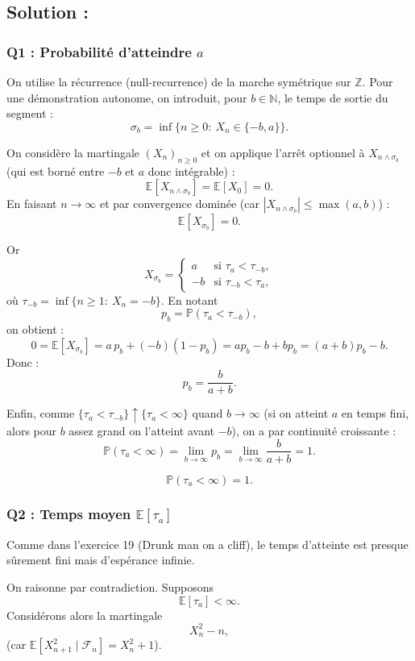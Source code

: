 \subsection*{Solution :}

\subsubsection*{Q1 : Probabilité d'atteindre $a$}

On utilise la récurrence (null-recurrence) de la marche symétrique sur $\mathbb{Z}$.
Pour une démonstration autonome, on introduit, pour $b\in\mathbb{N}$, le temps de sortie du segment :
\[
\sigma_b=\inf\{n\ge 0:\ X_n\in\{-b,a\}\}.
\]

On considère la martingale $(X_n)_{n\ge 0}$ et on applique l'arrêt optionnel à $X_{n\wedge\sigma_b}$ (qui est borné entre $-b$ et $a$ donc intégrable) :
\[
\mathbb{E}[X_{n\wedge\sigma_b}]=\mathbb{E}[X_0]=0.
\]
En faisant $n\to\infty$ et par convergence dominée (car $|X_{n\wedge\sigma_b}|\le \max(a,b)$) :
\[
\mathbb{E}[X_{\sigma_b}]=0.
\]

Or
\[
X_{\sigma_b}=
\begin{cases}
a & \text{si } \tau_a<\tau_{-b},\\
-b & \text{si } \tau_{-b}<\tau_a,
\end{cases}
\]
où $\tau_{-b}=\inf\{n\ge1:\ X_n=-b\}$.
En notant
\[
p_b=\mathbb{P}(\tau_a<\tau_{-b}),
\]
on obtient :
\[
0=\mathbb{E}[X_{\sigma_b}]=a\,p_b+(-b)(1-p_b)=a p_b-b+b p_b=(a+b)p_b-b.
\]
Donc :
\[
p_b=\frac{b}{a+b}.
\]

Enfin, comme $\{\tau_a<\tau_{-b}\}\uparrow \{\tau_a<\infty\}$ quand $b\to\infty$ (si on atteint $a$ en temps fini, alors pour $b$ assez grand on l'atteint avant $-b$), on a par continuité croissante :
\[
\mathbb{P}(\tau_a<\infty)=\lim_{b\to\infty}p_b=\lim_{b\to\infty}\frac{b}{a+b}=1.
\]

\[
\boxed{\mathbb{P}(\tau_a<\infty)=1.}
\]

\subsubsection*{Q2 : Temps moyen $\mathbb{E}[\tau_a]$}

Comme dans l'exercice 19 (Drunk man on a cliff), le temps d'atteinte est presque sûrement fini mais d'espérance infinie.

On raisonne par contradiction. Supposons
\[
\mathbb{E}[\tau_a]<\infty.
\]
Considérons alors la martingale
\[
X_n^2-n,
\]
(car $\mathbb{E}[X_{n+1}^2\mid \mathcal{F}_n]=X_n^2+1$).

